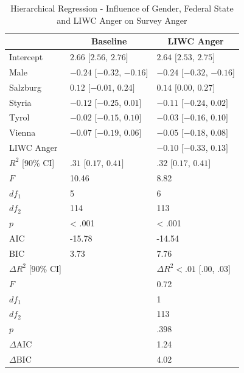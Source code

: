 \documentclass[
  english,
  jou,floatsintext]{apa7}
\begin{document}
\begin{table}[b]

\begin{center}
\begin{threeparttable}

\caption{\label{tab:table-ang-liwc}Hierarchical Regression - Influence of Gender, Federal State and LIWC Anger on Survey Anger}

\small{

\begin{tabular}{lll}
\toprule
 & \multicolumn{1}{c}{Baseline} & \multicolumn{1}{c}{LIWC Anger}\\
\midrule
Intercept & $2.66$ $[2.56$, $2.76]$ & $2.64$ $[2.53$, $2.75]$\\
Male & $-0.24$ $[-0.32$, $-0.16]$ & $-0.24$ $[-0.32$, $-0.16]$\\
Salzburg & $0.12$ $[-0.01$, $0.24]$ & $0.14$ $[0.00$, $0.27]$\\
Styria & $-0.12$ $[-0.25$, $0.01]$ & $-0.11$ $[-0.24$, $0.02]$\\
Tyrol & $-0.02$ $[-0.15$, $0.10]$ & $-0.03$ $[-0.16$, $0.10]$\\
Vienna & $-0.07$ $[-0.19$, $0.06]$ & $-0.05$ $[-0.18$, $0.08]$\\
LIWC Anger &  & $-0.10$ $[-0.33$, $0.13]$\\
$R^2$ [90\% CI] & $.31$ $[0.17$, $0.41]$ & $.32$ $[0.17$, $0.41]$\\
$F$ & 10.46 & 8.82\\
$df_1$ & 5 & 6\\
$df_2$ & 114 & 113\\
$p$ & < .001 & < .001\\
$\mathrm{AIC}$ & -15.78 & -14.54\\
$\mathrm{BIC}$ & 3.73 & 7.76\\
$\Delta R^2$ [90\% CI] &  & $\Delta R^2 < .01$ $[.00$, $.03]$\\
$F$ &  & 0.72\\
$df_1$ &  & 1\\
$df_2$ &  & 113\\
$p$ &  & .398\\
$\Delta \mathrm{AIC}$ &  & 1.24\\
$\Delta \mathrm{BIC}$ &  & 4.02\\
\bottomrule
\end{tabular}

}

\end{threeparttable}
\end{center}

\end{table}
\end{document}
